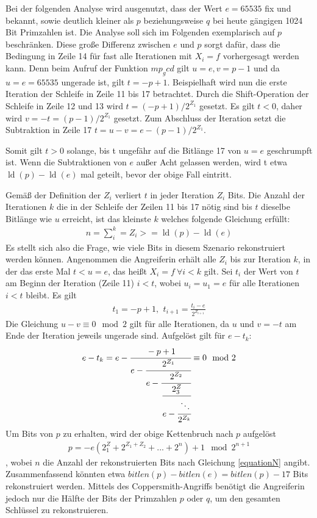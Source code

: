 Bei der folgenden Analyse wird ausgenutzt, dass der Wert $e=65535$ fix und bekannt, sowie deutlich kleiner als $p$ beziehungsweise $q$ bei heute gängigen 1024 Bit Primzahlen ist.
Die Analyse soll sich im Folgenden exemplarisch auf $p$ beschränken.
Diese große Differenz zwischen $e$ und $p$ sorgt dafür, dass die Bedingung in Zeile 14 für fast alle Iterationen mit $X_i = f$ vorhergesagt werden kann.
Denn beim Aufruf der Funktion $mp_gcd$ gilt $u=e, v=p-1$ und da $u=e=65535$ ungerade ist, gilt $t=-p+1$.
Beispielhaft wird nun die erste Iteration der Schleife in Zeile 11 bis 17 betrachtet.
Durch die Shift-Operation der Schleife in Zeile 12 und 13 wird $t=(-p+1)/2^{Z_1}$ gesetzt.
Es gilt $t<0$, daher wird $v=-t=(p-1)/2^{Z_1}$ gesetzt. 
Zum Abschluss der Iteration setzt die Subtraktion in Zeile 17 $t=u-v=e-(p-1)/2^{Z_1}$.

Somit gilt $t>0$ solange, bis t ungefähr auf die Bitlänge 17 von $u=e$ geschrumpft ist.
Wenn die Subtraktionen von $e$ außer Acht gelassen werden, wird t etwa $\operatorname{ld}(p) - \operatorname{ld}(e)$ mal geteilt, bevor der obige Fall eintritt.

Gemäß der Definition der $Z_i$ verliert $t$ in jeder Iteration $Z_i$ Bits. 
Die Anzahl der Iterationen $k$ die in der Schleife der Zeilen 11 bis 17 nötig sind bis $t$ dieselbe Bitlänge wie $u$ erreicht, ist das kleinste $k$ welches folgende Gleichung erfüllt: 
\begin{align}
\label{equationN}
n = \sum\limits_i^k = Z_i >= \operatorname{ld}(p) - \operatorname{ld}(e)
\end{align}
Es stellt sich also die Frage, wie viele Bits in diesem Szenario rekonstruiert werden können.
Angenommen die Angreiferin erhält alle $Z_i$ bis zur Iteration $k$, in der das erste Mal $t<u=e$, das heißt $X_i=f \: \forall i < k$ gilt.
Sei $t_i$ der Wert von $t$ am Beginn der Iteration (Zeile 11) $i<t$, wobei $u_i=u_1=e$ für alle Iterationen $i<t$ bleibt.
Es gilt 
\begin{align}
t_1=-p+1 \text{, } \: t_{i+1} = \frac{t_i - e}{2^{Z_{i+1}}}
\end{align}
Die Gleichung $u-v \equiv 0 \mod 2$ gilt für alle Iterationen, da $u$ und $v=-t$ am Ende der Iteration jeweils ungerade sind.
Aufgelöst gilt für $e-t_k$:
\begin{align}
e-t_k = e- \cfrac{-p+1}{e - \cfrac{2^{Z_1}}{e- \cfrac{2^{Z_2}}{
          \cfrac{2^Z_3}{e - \cfrac{\ddots}{2^{Z_k}}}}}} \equiv 0 \mod 2
\end{align}
Um Bits von $p$ zu erhalten, wird der obige Kettenbruch nach $p$ aufgelöst
\begin{align}
p = -e(2^Z_1+2^{Z_1+Z_2}+...+2^n)+1 \mod 2^{n+1}
\end{align}
, wobei $n$ die Anzahl der rekonstruierten Bits nach Gleichung \ref{equationN} angibt.
Zusammenfassend könnten etwa $bitlen(p)-bitlen(e)=bitlen(p)-17$ Bits rekonstruiert werden.
Mittels des Coppersmith-Angriffs \cite{CoppersmithBound} benötigt die Angreiferin jedoch nur die Hälfte der Bits der Primzahlen $p$ oder $q$, um den gesamten Schlüssel zu rekonstruieren.

